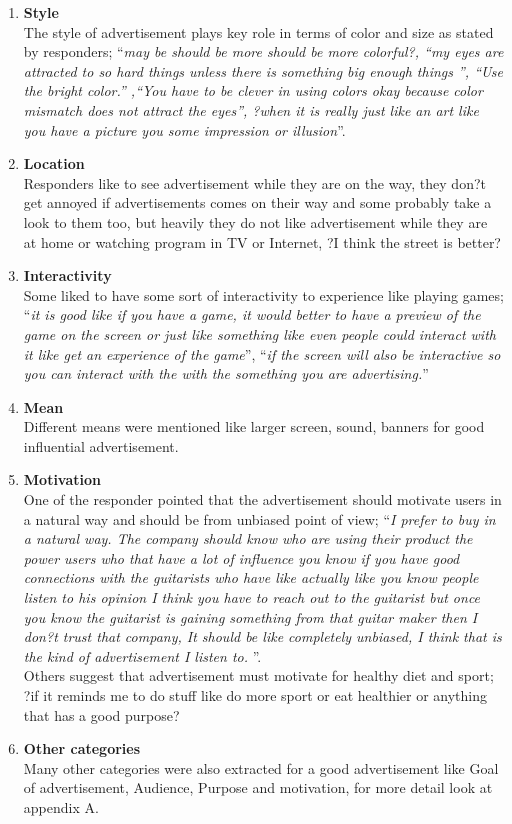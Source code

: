 \begin{enumerate}
\item \textbf{Style} \\	
The style of advertisement plays key role in terms of color and size as stated by responders; ``\emph{may be should be more should be more colorful?, ``\emph{my eyes are attracted to so hard things unless there is something big enough things }'', ``\emph{Use the bright color.}'' ,``\emph{You have to be clever in using colors okay because color mismatch does not attract the eyes}'', ?when it is really just like an art like you have a picture you some impression or illusion}''.

\item \textbf{Location} \\	
Responders like to see advertisement while they are on the way, they don?t get annoyed if advertisements comes on their way and some probably take a look to them too, but heavily they do not like advertisement while they are at home or watching program in TV or Internet, ?I think the street is better?

\item \textbf{Interactivity} \\	
Some liked to have some sort of interactivity to experience like playing games; ``\emph{it is good like if you have a game, it would better to have a preview of the game on the screen or just like something like even people could interact with it like get an experience of the game}'', ``\emph{if the screen will also be interactive so you can interact with the with the something you are advertising.}''

\item \textbf{Mean} \\
Different means were mentioned like larger screen, sound, banners for good influential advertisement.

\item \textbf{Motivation} \\
One of the responder pointed that the advertisement should motivate users in a natural way and should be from unbiased point of view; ``\emph{I prefer to buy in a natural way. The company should know who are using their product the power users who that have a lot of influence you know if you have good connections with the guitarists who have like actually like you know people listen to his opinion I think you have to reach out to the guitarist but once you know the guitarist is gaining something from that guitar maker then I don?t trust that company, It should be like completely unbiased, I think that is the kind of advertisement I listen to. }''. \\

Others suggest that advertisement must motivate for healthy diet and sport; ?if it reminds me to do stuff like do more sport or eat healthier or anything that has a good purpose?

\item \textbf{Other categories} \\
Many other categories were also extracted for a good advertisement like Goal of advertisement, Audience, Purpose and motivation, for more detail look at appendix A.
		
\end{enumerate}
